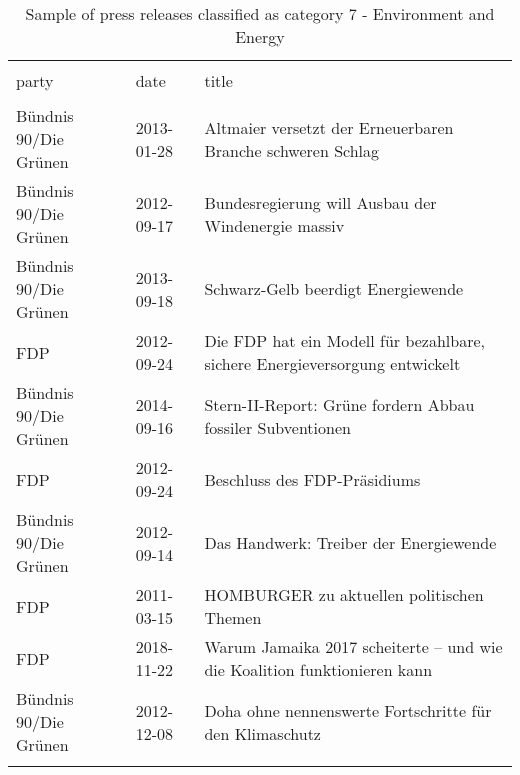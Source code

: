 
\begin{table}[!htbp] \centering 
  \caption{Sample of press releases classified as category 7 - Environment and Energy} 
  \label{tab:7-document-samples} 
\begin{tabularx}{\textwidth}{ssX} 
\\[-1.8ex]\hline 
\hline \\[-1.8ex] 
party & date & title \\ 
\hline \\[-1.8ex] 
Bündnis 90/Die Grünen & 2013-01-28 & Altmaier versetzt der Erneuerbaren Branche schweren Schlag \\ 
Bündnis 90/Die Grünen & 2012-09-17 & Bundesregierung will Ausbau der Windenergie massiv \\ 
Bündnis 90/Die Grünen & 2013-09-18 & Schwarz-Gelb beerdigt Energiewende \\ 
FDP & 2012-09-24 & Die FDP hat ein Modell für bezahlbare, sichere Energieversorgung entwickelt \\ 
Bündnis 90/Die Grünen & 2014-09-16 & Stern-II-Report: Grüne fordern Abbau fossiler Subventionen \\ 
FDP & 2012-09-24 & Beschluss des FDP-Präsidiums \\ 
Bündnis 90/Die Grünen & 2012-09-14 & Das Handwerk: Treiber der Energiewende \\ 
FDP & 2011-03-15 & HOMBURGER zu aktuellen politischen Themen \\ 
FDP & 2018-11-22 & Warum Jamaika 2017 scheiterte – und wie die Koalition funktionieren kann \\ 
Bündnis 90/Die Grünen & 2012-12-08 & Doha ohne nennenswerte Fortschritte für den Klimaschutz \\ 
\hline \\[-1.8ex] 
\end{tabularx} 
\end{table} 
